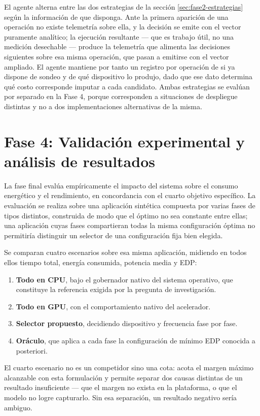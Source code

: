\documentclass[12pt,oneside,spanish]{book}
\begin{document}
El agente alterna entre las dos estrategias de la sección \ref{sec:fase2-estrategias} según la información de que disponga. Ante la primera aparición de una operación no existe telemetría sobre ella, y la decisión se emite con el vector puramente analítico; la ejecución resultante --- que es trabajo útil, no una medición desechable --- produce la telemetría que alimenta las decisiones siguientes sobre esa misma operación, que pasan a emitirse con el vector ampliado. El agente mantiene por tanto un registro por operación de si ya dispone de sondeo y de qué dispositivo lo produjo, dado que ese dato determina qué costo corresponde imputar a cada candidato. Ambas estrategias se evalúan por separado en la Fase 4, porque corresponden a situaciones de despliegue distintas y no a dos implementaciones alternativas de la misma.

\section{Fase 4: Validación experimental y análisis de resultados}
\label{sec:fase4}

La fase final evalúa empíricamente el impacto del sistema sobre el consumo energético y el rendimiento, en concordancia con el cuarto objetivo específico. La evaluación se realiza sobre una aplicación sintética compuesta por varias fases de tipos distintos, construida de modo que el óptimo no sea constante entre ellas; una aplicación cuyas fases compartieran todas la misma configuración óptima no permitiría distinguir un selector de una configuración fija bien elegida.

Se comparan cuatro escenarios sobre esa misma aplicación, midiendo en todos ellos tiempo total, energía consumida, potencia media y EDP:

\begin{enumerate}
    \item \textbf{Todo en CPU}, bajo el gobernador nativo del sistema operativo, que constituye la referencia exigida por la pregunta de investigación.
    \item \textbf{Todo en GPU}, con el comportamiento nativo del acelerador.
    \item \textbf{Selector propuesto}, decidiendo dispositivo y frecuencia fase por fase.
    \item \textbf{Oráculo}, que aplica a cada fase la configuración de mínimo EDP conocida a posteriori.
\end{enumerate}

El cuarto escenario no es un competidor sino una cota: acota el margen máximo alcanzable con esta formulación y permite separar dos causas distintas de un resultado insuficiente --- que el margen no exista en la plataforma, o que el modelo no logre capturarlo. Sin esa separación, un resultado negativo sería ambiguo.
\end{document}
